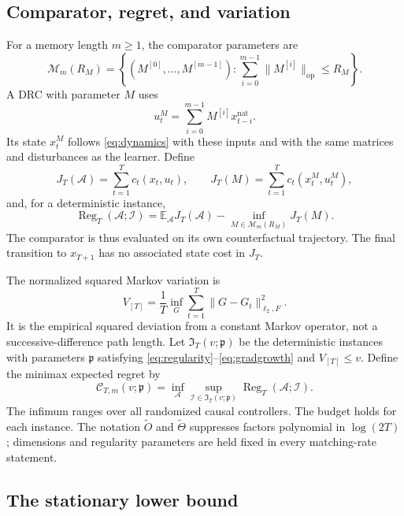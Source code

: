 \documentclass[11pt]{article}
\theoremstyle{remark}
\newcommand{\E}{\mathbb E}
\newcommand{\Reg}{\operatorname{Reg}}
\newcommand{\op}{\mathrm{op}}
\newcommand{\nat}{\mathrm{nat}}
\newcommand{\cclass}{\mathcal C}
\begin{document}
\subsection{Comparator, regret, and variation}

For a memory length $m\ge1$, the comparator parameters are
\begin{equation}\label{eq:drcclass}
 \mathcal M_m(R_M)=\left\{(M^{[0]},\ldots,M^{[m-1]}):
 \sum_{i=0}^{m-1}\|M^{[i]}\|_{\op}\le R_M\right\}.
\end{equation}
A DRC with parameter $M$ uses
\begin{equation}\label{eq:drc}
 u_t^M=\sum_{i=0}^{m-1}M^{[i]}x_{t-i}^{\nat}.
\end{equation}
Its state $x_t^M$ follows \eqref{eq:dynamics} with these inputs and with
the same matrices and disturbances as the learner. Define
\[
 J_T(\mathcal A)=\sum_{t=1}^T c_t(x_t,u_t),\qquad
 J_T(M)=\sum_{t=1}^T c_t(x_t^M,u_t^M),
\]
and, for a deterministic instance,
\begin{equation}\label{eq:regdef}
 \Reg_T(\mathcal A;\mathcal I)
 =\E_{\mathcal A}J_T(\mathcal A)
    -\inf_{M\in\mathcal M_m(R_M)}J_T(M).
\end{equation}
The comparator is thus evaluated on its own counterfactual trajectory.
The final transition to $x_{T+1}$ has no associated state cost in $J_T$.

The normalized squared Markov variation is
\begin{equation}\label{eq:variation}
 V_{[T]}=\frac1T\inf_G\sum_{t=1}^T\|G-G_t\|_{\ell_2,F}^2.
\end{equation}
It is the empirical squared deviation from a constant Markov operator,
not a successive-difference path length. Let $\mathfrak I_T(v;\mathfrak p)$
be the deterministic instances with parameters $\mathfrak p$ satisfying
\eqref{eq:regularity}--\eqref{eq:gradgrowth} and $V_{[T]}\le v$.
Define the minimax expected regret by
\begin{equation}\label{eq:minimax}
 \cclass_{T,m}(v;\mathfrak p)
 =\inf_{\mathcal A}
   \sup_{\mathcal I\in\mathfrak I_T(v;\mathfrak p)}
   \Reg_T(\mathcal A;\mathcal I).
\end{equation}
The infimum ranges over all randomized causal controllers. The budget
holds for each instance.
The notation $\widetilde O$ and $\widetilde\Theta$ suppresses factors
polynomial in $\log(2T)$; dimensions and regularity parameters are held
fixed in every matching-rate statement.

\subsection{The stationary lower bound}
\end{document}
